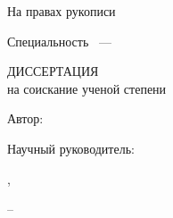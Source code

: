 
%
%
%
%

\thispagestyle{empty}

\begin{center}
\dissorg
\par
\end{center}

\vspace{10mm}
\begin{flushright}
На правах рукописи

\end{flushright}

\vspace{20mm}
\begin{center}
{\bf \large \dissauthor}
\end{center}

\vspace{5mm}
\begin{center}
{\bf \large \disstitle
\par}

\vspace{10mm}
{%
Специальность \specnum~---

\specname
}

\vspace{10mm}
ДИССЕРТАЦИЯ \\ на соискание ученой степени \\

\edudegree
\end{center}

\vspace{5mm}
\begin{flushleft}
	Автор:
\end{flushleft}

\vspace{5mm}
\begin{flushright}
Научный руководитель:

\mentordegree, \mentortitle

\mentorname
\end{flushright}





\vfill
\begin{center}
{\disscity -- \dissyear}
\end{center}

